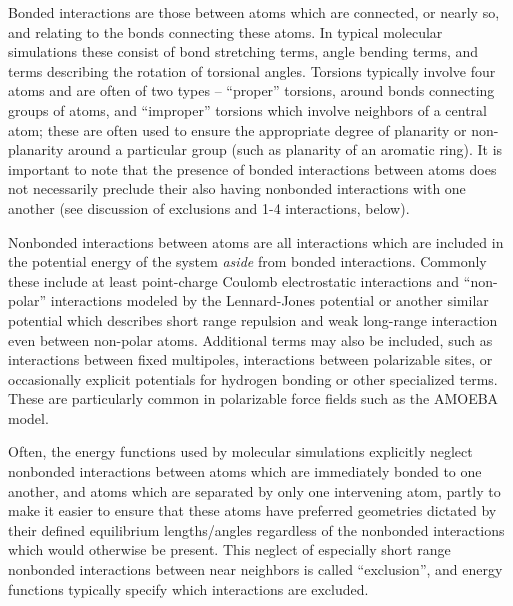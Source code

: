 \documentclass[9pt,bestpractices]{livecoms}
\begin{document}
Bonded interactions are those between atoms which are connected, or nearly so,
and relating to the bonds connecting these atoms.  In typical molecular
simulations these consist of bond stretching terms, angle bending terms,
and terms describing the rotation of torsional angles.  Torsions
typically involve four atoms and are often of two types -- ``proper''
torsions, around bonds connecting groups of atoms, and ``improper''
torsions which involve neighbors of a central atom; these are often used
to ensure the appropriate degree of planarity or non-planarity around a
particular group (such as planarity of an aromatic ring).  It is
important to note that the presence of bonded interactions between atoms
does not necessarily preclude their also having nonbonded interactions
with one another (see discussion of exclusions and 1-4 interactions,
below).

Nonbonded interactions between atoms are all interactions which are included in
the potential energy of the system \emph{aside} from bonded
interactions.  Commonly these include at least point-charge Coulomb
electrostatic interactions and ``non-polar'' interactions modeled by the
Lennard-Jones potential or another similar potential which describes
short range repulsion and weak long-range interaction even between
non-polar atoms.
Additional terms may also be included, such as interactions between fixed
multipoles, interactions between polarizable sites, or occasionally
explicit potentials for hydrogen bonding or other specialized terms.
These are particularly common in polarizable force fields such as the
AMOEBA model.

Often, the energy functions used by molecular simulations explicitly neglect
nonbonded interactions between atoms which are immediately bonded to one
another, and atoms which are separated by only one intervening atom,
partly to make it easier to ensure that these atoms have preferred
geometries dictated by their defined equilibrium lengths/angles
regardless of the nonbonded interactions which would otherwise be
present.  This neglect of especially short range nonbonded interactions
between near neighbors is called ``exclusion'', and energy functions
typically specify which interactions are excluded.
\end{document}
